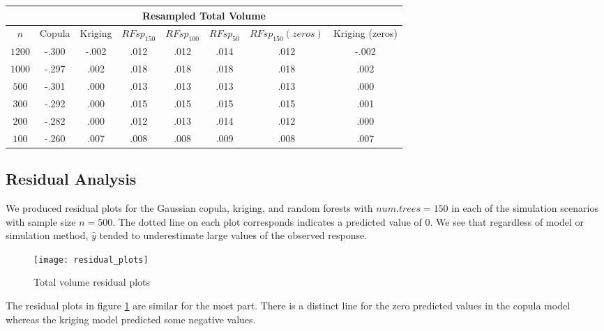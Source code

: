 \documentclass{article}
\begin{document}
\begin{center}
	\begin{singlespace}
\begin{tabular}{|| c | c c c c c c c ||}
\hline
\multicolumn{8}{||c||}{Resampled Total Volume} \\
\hline
$n$ & Copula & Kriging & $RFsp_{150}$ & $RFsp_{100}$ & $RFsp_{50}$ & $RFsp_{150}(zeros)$ & Kriging (zeros) \\ [.5ex] 
\hline\hline
$1200$ & \cellcolor{gray}-.300 & \cellcolor{cyan}-.002 & .012 & .012 & .014 & .012 & \cellcolor{cyan}-.002 \\
$1000$ & \cellcolor{gray}-.297 & \cellcolor{cyan}.002 & .018 & .018 & .018 & .018 & \cellcolor{cyan}.002 \\
$500$ & \cellcolor{gray}-.301 & \cellcolor{cyan}.000 & .013 & .013 & .013 & .013 & \cellcolor{cyan}.000 \\
$300$ & \cellcolor{gray}-.292 & \cellcolor{cyan}.000 & .015 & .015 & .015 & .015 & .001 \\
$200$ & \cellcolor{gray}-.282 & \cellcolor{cyan}.000 & .012 & .013 & .014 & .012 & \cellcolor{cyan}.000 \\
$100$ & \cellcolor{gray}-.260 & \cellcolor{cyan}.007 & .008 & .008 & .009 & .008 & \cellcolor{cyan}.007 \\ [.5ex] 
\hline
\end{tabular}
\end{singlespace}
\end{center}

\subsection{Residual Analysis}

We produced residual plots for the Gaussian copula, kriging, and random forests with $num.trees=150$ in each of the simulation scenarios with sample size $n = 500$.
The dotted line on each plot corresponds indicates a predicted value of 0.
We see that regardless of model or simulation method, $\hat{y}$ tended to underestimate large values of the observed response.
\begin{figure}[h]
	\centering
\texttt{[image: residual\_plots]}
\caption{\label{fig:total_resids}Total volume residual plots}
\end{figure}

The residual plots in figure \ref{fig:total_resids} are similar for the most part.
There is a distinct line for the zero predicted values in the copula model whereas the kriging model predicted some negative values.
\end{document}
